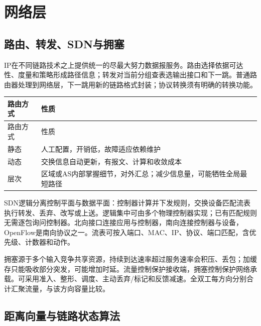 \chapter{网络层}\label{CN04}

\section{路由、转发、SDN与拥塞}\label{CN04-forwarding}

IP在不同链路技术之上提供统一的尽最大努力数据报服务。路由选择依据可达性、度量和策略形成路径信息；转发对当前分组查表选输出接口和下一跳。普通路由器处理到网络层，下一跳用新的链路格式封装；协议转换须有明确的转换功能。

\par\smallskip
{\fontsize{9.3}{12}\selectfont\setlength{\tabcolsep}{2.5pt}\setlength{\LTleft}{0pt}\setlength{\LTright}{0pt}
\begin{longtable}{@{}>{\raggedright\arraybackslash}p{}>{\raggedright\arraybackslash}p{}@{}}
\toprule
路由方式 & 性质 \\

\midrule\endfirsthead\toprule
路由方式 & 性质 \\

\midrule\endhead\bottomrule\endfoot
静态 & 人工配置，开销低，故障适应依赖维护 \\

动态 & 交换信息自动更新，有报文、计算和收敛成本 \\

层次 & 区域或AS内部掌握细节，对外汇总；减少信息量，可能牺牲全局最短路径 \\

\end{longtable}}
\par\smallskip

SDN逻辑分离控制平面与数据平面：控制器计算并下发规则，交换设备匹配流表执行转发、丢弃、改写或上送。逻辑集中可由多个物理控制器实现；已有匹配规则无需逐包询问控制器。北向接口连接应用与控制器，南向连接控制器与设备，OpenFlow是南向协议之一。流表可按入端口、MAC、IP、协议、端口匹配，含优先级、计数器和动作。

拥塞源于多个输入竞争共享资源，持续到达速率超过服务速率会积压、丢包；加缓存只能吸收部分突发，可能增加时延。流量控制保护接收端，拥塞控制保护网络承载。可采用准入、整形、调度、主动丢弃/标记和反馈减速。全双工每方向分别合计汇聚流量，与该方向容量比较。

\section{距离向量与链路状态算法}\label{CN04-routing-algorithms}


